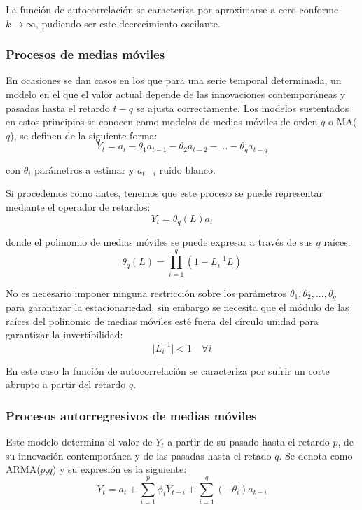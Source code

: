 La función de autocorrelación se caracteriza por aproximarse a cero conforme $k \rightarrow \infty$, pudiendo ser este decrecimiento oscilante.

\subsubsection{Procesos de medias móviles}
En ocasiones se dan casos en los que para una serie temporal determinada, un modelo en el que el valor actual depende de las innovaciones contemporáneas y pasadas hasta el retardo $t-q$ se ajusta correctamente. Los modelos sustentados en estos principios se conocen como modelos de medias móviles de orden $q$ o MA($q$), se definen de la siguiente forma:
\begin{equation}
    Y_{t} =  a_{t}-\theta_{1}a_{t-1}-\theta_{2}a_{t-2}-...-\theta_{q}a_{t-q}
\end{equation}

\noindent con $\theta_i$ parámetros a estimar y $a_{t-i}$ ruido blanco.

Si procedemos como antes, tenemos que este proceso se puede representar mediante el operador de retardos:
\begin{equation}
    Y_{t} = \theta_{q}(L)a_{t}
\end{equation}

\noindent donde el polinomio de medias móviles se puede expresar a través de sus $q$ raíces:
\begin{equation}
    \theta_{q}(L) =  \prod_{i=1}^{q}(1-L_{i}^{-1}L)
\end{equation}

No es necesario imponer ninguna restricción sobre los parámetros $\theta_{1}, \theta_{2},...,\theta_{q}$ para garantizar la estacionariedad, sin embargo se necesita que el módulo de las raíces del polinomio de medias móviles esté fuera del círculo unidad para garantizar la invertibilidad:
\begin{equation}
\mid L_{i}^{-1}\mid < 1 \quad \forall{i}
\end{equation}

En este caso la función de autocorrelación se caracteriza por sufrir un corte abrupto a partir del retardo $q$.

\subsubsection{Procesos autorregresivos de medias móviles}
Este modelo determina el valor de $Y_{t}$ a partir de su pasado hasta el retardo $p$, de su innovación contemporánea y de las pasadas hasta el retado $q$. Se denota como ARMA($p$,$q$) y su expresión es la siguiente:
\begin{equation}
    Y_{t} = a_{t} + \sum_{i=1}^{p} \phi_{i} Y_{t-i} + \sum_{i=1}^{q} (-\theta_{i}) a_{t-i}
\end{equation}

